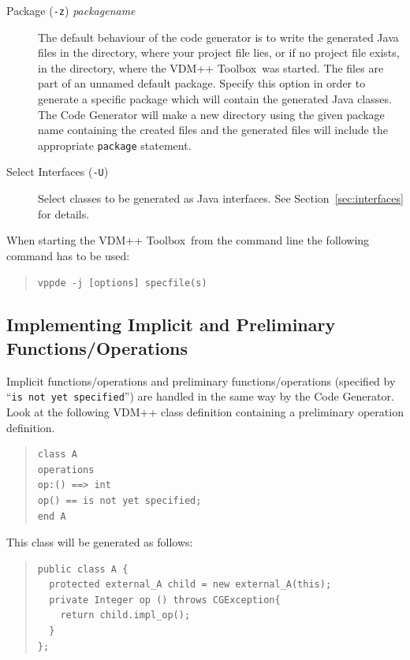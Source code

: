 \documentclass[\pformat,11pt]{article}
\newcommand{\ToolboxName}{VDM++ Toolbox}
\newcommand{\tcg}{the Code Generator}
\begin{document}
\begin{description}
\item [Package (\texttt{-z}) \textit{packagename}] 
  The default behaviour of the code
  generator is to write the generated Java files in the directory,
  where your project file lies, or if no project file exists, in the
  directory, where the \ToolboxName\ was started. The files are part
  of an unnamed default package. Specify this
  option in order to generate a specific package
  which will contain the generated Java classes. The Code Generator
  will make a new directory using the given package name containing the
  created files and the generated files will include the appropriate
  \texttt{package} statement.%
\item [Select Interfaces (\texttt{-U})]
  Select classes to be generated as Java interfaces. See
  Section~\ref{sec:interfaces} for details.
\end{description}

When starting the \ToolboxName\ from the command line the following
command has to be used:  

\begin{quote}
\begin{verbatim}
vppde -j [options] specfile(s)
\end{verbatim}
\end{quote}


\subsection{Implementing Implicit and Preliminary Functions/Operations}\label{implicit}

Implicit functions/operations and preliminary functions/operations
(specified by ``{\tt is not yet specified}'') are handled in the same
way by \tcg{}. Look at the following VDM++ class definition containing
a preliminary operation definition.

\begin{quote}
\begin{verbatim}
class A
operations
op:() ==> int
op() == is not yet specified;
end A
\end{verbatim}
\end{quote}

This class will be generated as follows:

\begin{quote}
\begin{verbatim}
public class A {
  protected external_A child = new external_A(this);
  private Integer op () throws CGException{
    return child.impl_op();
  }
};
\end{verbatim}
\end{quote}
\end{document}
